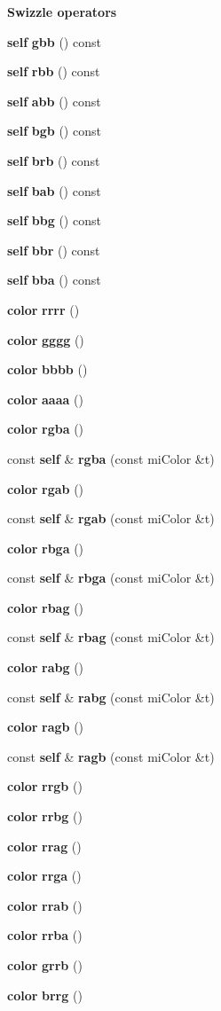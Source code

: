 \begin{Indent}{\bf Swizzle operators}
\begin{CompactItemize}
\item 
{\bf self} {\bf gbb} () const 
\item 
{\bf self} {\bf rbb} () const 
\item 
{\bf self} {\bf abb} () const 
\item 
{\bf self} {\bf bgb} () const 
\item 
{\bf self} {\bf brb} () const 
\item 
{\bf self} {\bf bab} () const 
\item 
{\bf self} {\bf bbg} () const 
\item 
{\bf self} {\bf bbr} () const 
\item 
{\bf self} {\bf bba} () const 
\item 
{\bf color} {\bf rrrr} ()
\item 
{\bf color} {\bf gggg} ()
\item 
{\bf color} {\bf bbbb} ()
\item 
{\bf color} {\bf aaaa} ()
\item 
{\bf color} {\bf rgba} ()
\item 
const {\bf self} \& {\bf rgba} (const mi\-Color \&t)
\item 
{\bf color} {\bf rgab} ()
\item 
const {\bf self} \& {\bf rgab} (const mi\-Color \&t)
\item 
{\bf color} {\bf rbga} ()
\item 
const {\bf self} \& {\bf rbga} (const mi\-Color \&t)
\item 
{\bf color} {\bf rbag} ()
\item 
const {\bf self} \& {\bf rbag} (const mi\-Color \&t)
\item 
{\bf color} {\bf rabg} ()
\item 
const {\bf self} \& {\bf rabg} (const mi\-Color \&t)
\item 
{\bf color} {\bf ragb} ()
\item 
const {\bf self} \& {\bf ragb} (const mi\-Color \&t)
\item 
{\bf color} {\bf rrgb} ()
\item 
{\bf color} {\bf rrbg} ()
\item 
{\bf color} {\bf rrag} ()
\item 
{\bf color} {\bf rrga} ()
\item 
{\bf color} {\bf rrab} ()
\item 
{\bf color} {\bf rrba} ()
\item 
{\bf color} {\bf grrb} ()
\item 
{\bf color} {\bf brrg} ()

\end{CompactItemize}
\end{Indent}
